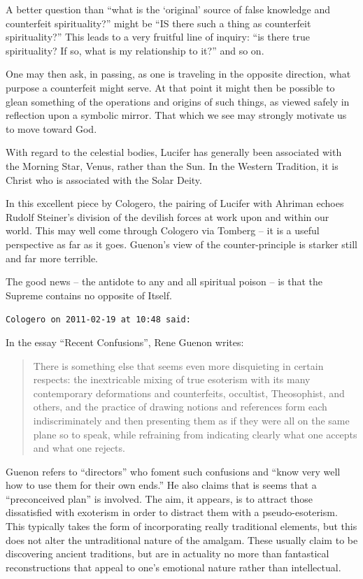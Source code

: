 \begin{footnotesize}
\begin{sffamily}
A better question than ``what is the `original' source of false knowledge and counterfeit spirituality?'' might be ``IS there such a thing as counterfeit spirituality?'' This leads to a very fruitful line of inquiry: ``is there true spirituality? If so, what is my relationship to it?'' and so on.

One may then ask, in passing, as one is traveling in the opposite direction, what purpose a counterfeit might serve. At that point it might then be possible to glean something of the operations and origins of such things, as viewed safely in reflection upon a symbolic mirror. That which we see may strongly motivate us to move toward God.

With regard to the celestial bodies, Lucifer has generally been associated with the Morning Star, Venus, rather than the Sun. In the Western Tradition, it is Christ who is associated with the Solar Deity.

In this excellent piece by Cologero, the pairing of Lucifer with Ahriman echoes Rudolf Steiner's division of the devilish forces at work upon and within our world. This may well come through Cologero via Tomberg -- it is a useful perspective as far as it goes. Guenon's view of the counter-principle is starker still and far more terrible.

The good news -- the antidote to any and all spiritual poison -- is that the Supreme contains no opposite of Itself.

\hfill

\texttt{Cologero on 2011-02-19 at 10:48 said:}

In the essay ``Recent Confusions'', Rene Guenon writes:

\begin{quote}\footnotesize

There is something else that seems even more disquieting in certain respects: the inextricable mixing of true esoterism with its many contemporary deformations and counterfeits, occultist, Theosophist, and others, and the practice of drawing notions and references form each indiscriminately and then presenting them as if they were all on the same plane so to speak, while refraining from indicating clearly what one accepts and what one rejects.
\end{quote}


Guenon refers to ``directors'' who foment such confusions and ``know very well how to use them for their own ends.'' He also claims that is seems that a ``preconceived plan'' is involved. The aim, it appears, is to attract those dissatisfied with exoterism in order to distract them with a pseudo-esoterism. This typically takes the form of incorporating really traditional elements, but this does not alter the untraditional nature of the amalgam. These usually claim to be discovering ancient traditions, but are in actuality no more than fantastical reconstructions that appeal to one's emotional nature rather than intellectual.


\end{sffamily}
\end{footnotesize}
